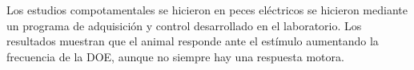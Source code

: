 \documentclass[12pt, a4paper, twoside]{report}
\begin{document}
Los estudios compotamentales se hicieron en peces eléctricos se hicieron mediante un programa de adquisición y control desarrollado en el laboratorio. Los resultados muestran que el animal responde ante el estímulo aumentando la frecuencia de la DOE, aunque no siempre hay una respuesta motora.


\tableofcontents







\appendix


\end{document}
